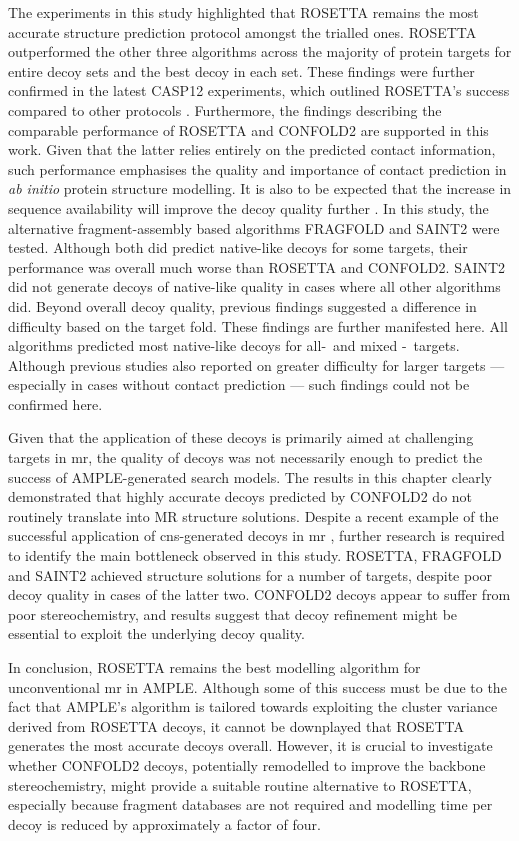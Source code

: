 The experiments in this study highlighted that ROSETTA remains the most accurate structure prediction protocol amongst the trialled ones. ROSETTA outperformed the other three algorithms across the majority of protein targets for entire decoy sets and the best decoy in each set. These findings were further confirmed in the latest CASP12 experiments, which outlined ROSETTA's success compared to other protocols \cite{Ovchinnikov2017-wp,Abriata2018-lu}. Furthermore, the findings describing the comparable performance of ROSETTA and CONFOLD2 \cite{Adhikari2018-lj,Michel2017-xh} are supported in this work. Given that the latter relies entirely on the predicted contact information, such performance emphasises the quality and importance of contact prediction in \textit{ab initio} protein structure modelling. It is also to be expected that the increase in sequence availability will improve the decoy quality further \cite{Abriata2018-lu,Schaarschmidt2018-mh}.  
In this study, the alternative fragment-assembly based algorithms FRAGFOLD and SAINT2 were tested. Although both did predict native-like decoys for some targets, their performance was overall much worse than ROSETTA and CONFOLD2. SAINT2 did not generate decoys of native-like quality in cases where all other algorithms did. Beyond overall decoy quality, previous findings suggested a difference in difficulty based on the target fold. These findings are further manifested here. All algorithms predicted most native-like decoys for all-\textalpha\ and mixed \textalpha-\textbeta\ targets. Although previous studies also reported on greater difficulty for larger targets --- especially in cases without contact prediction --- such findings could not be confirmed here.

Given that the application of these decoys is primarily aimed at challenging targets in \gls{mr}, the quality of decoys was not necessarily enough to predict the success of AMPLE-generated search models. The results in this chapter clearly demonstrated that highly accurate decoys predicted by CONFOLD2 do not routinely translate into MR structure solutions. Despite a recent example of the successful application of \gls{cns}-generated decoys in \gls{mr} \cite{Sjodt2018-zq}, further research is required to identify the main bottleneck observed in this study. ROSETTA, FRAGFOLD and SAINT2 achieved structure solutions for a number of targets, despite poor decoy quality in cases of the latter two. CONFOLD2 decoys appear to suffer from poor stereochemistry, and results suggest that decoy refinement might be essential to exploit the underlying decoy quality.

In conclusion, ROSETTA remains the best modelling algorithm for unconventional \gls{mr} in AMPLE. Although some of this success must be due to the fact that AMPLE's algorithm is tailored towards exploiting the cluster variance derived from ROSETTA decoys, it cannot be downplayed that ROSETTA generates the most accurate decoys overall. However, it is crucial to investigate whether CONFOLD2 decoys, potentially remodelled to improve the backbone stereochemistry, might provide a suitable routine alternative to ROSETTA, especially because fragment databases are not required and modelling time per decoy is reduced by approximately a factor of four.
